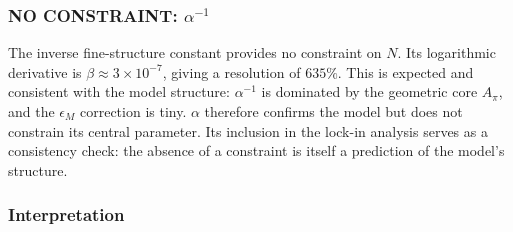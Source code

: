\documentclass[10pt,a4paper]{article}
\begin{document}
\subsubsection{NO CONSTRAINT: $\alpha^{-1}$}

The inverse fine-structure constant provides no constraint on $N$. Its
logarithmic derivative is $\beta \approx 3 \times 10^{-7}$, giving a
resolution of $635\%$. This is expected and consistent with the model
structure: $\alpha^{-1}$ is dominated by the geometric core $A_\pi$, and
the $\epsilon_M$ correction is tiny. $\alpha$ therefore confirms the
model but does not constrain its central parameter. Its inclusion in the
lock-in analysis serves as a consistency check: the absence of a
constraint is itself a prediction of the model's structure.

\subsubsection{Interpretation}
\end{document}
